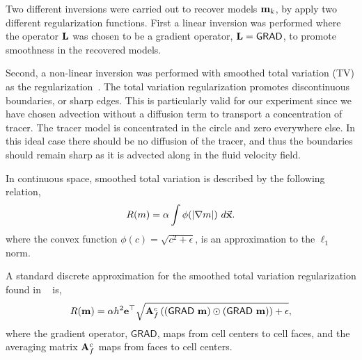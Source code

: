 \documentclass[11pt]{article}
\newcommand{\bfA}	{{\bf{A}}}
\newcommand{\bfL}	{{\bf{L}}}
\newcommand{\bfe}	{{\bf{e}}}
\newcommand{\bfm}	{{\bf{m}}}
\newcommand {\vx}    {\vec {\bf x}}
\newcommand{\grad}	{\ensuremath {{\bf{ \nabla}}}}
\newcommand{\GRADh}  {{\textsf{GRAD}}} %
\begin{document}
Two different inversions were carried out to recover models $\bfm_k$, by apply two different regularization functions.  
First a linear inversion was performed where the operator $\bfL$ was chosen to be a gradient operator,  $\bfL = \GRADh$, to promote smoothness in the recovered models.

Second, a non-linear inversion was performed with smoothed total variation (TV) as the  regularization~\cite{Ascher2006}.
 The total variation regularization promotes discontinuous boundaries, or sharp edges. This is particularly valid for our experiment since we have chosen advection without a diffusion term to transport a concentration of tracer. The tracer model is  concentrated in the circle and zero everywhere else. In this ideal case there should be no diffusion of the tracer, and thus the boundaries should remain sharp as it is advected along in the fluid velocity field.

In continuous space, smoothed total variation is described by the following relation,
\begin{equation}
		R(m) = \alpha \int  \phi(|\grad m|) \ d\vx.
\end{equation} 
where the convex function $\phi(c) = \sqrt{c^2 + \epsilon}$, is an approximation to the $\ell_1$ norm. 

A standard discrete 
approximation for the smoothed total variation regularization found in ~\cite{Ascher2006} is, 
\begin{equation}
\label{regsd}
R(\bfm) = \alpha h^2 \bfe^{\top} \sqrt{ \bfA_{f}^{c} \left( (\GRADh\ \bfm) \odot (\GRADh\ \bfm) \right)  + \epsilon},
\end{equation}
where the  gradient operator, $\GRADh$,   maps from cell centers to cell faces, and the averaging matrix $\bfA_{f}^{c}$ maps from faces to cell centers. 
\end{document}
